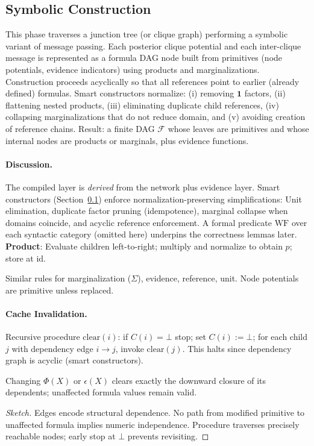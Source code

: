 \documentclass[11pt]{article}
\newcommand{\cF}{\mathcal{F}}
\newcommand{\Unit}{\mathbf{1}}
\newcommand{\Potf}{\Phi}
\newcommand{\Evid}{\epsilon}
\begin{document}
\subsection{Symbolic Construction}\label{sec:symbolic-construction}
This phase traverses a junction tree (or clique graph) performing a symbolic variant of message passing. Each posterior clique potential and each inter-clique message is represented as a formula DAG node built from primitives (node potentials, evidence indicators) using products and marginalizations. Construction proceeds acyclically so that all references point to earlier (already defined) formulas. Smart constructors normalize: (i) removing $\Unit$ factors, (ii) flattening nested products, (iii) eliminating duplicate child references, (iv) collapsing marginalizations that do not reduce domain, and (v) avoiding creation of reference chains. Result: a finite DAG $\cF$ whose leaves are primitives and whose internal nodes are products or marginals, plus evidence functions.
\paragraph{Discussion.} The compiled layer is \emph{derived} from the network plus evidence layer. Smart constructors (Section~\ref{sec:symbolic-construction}) enforce normalization-preserving simplifications: Unit elimination, duplicate factor pruning (idempotence), marginal collapse when domains coincide, and acyclic reference enforcement. A formal predicate $\mathrm{WF}$ over each syntactic category (omitted here) underpins the correctness lemmas later.
\noindent\textbf{Product}: Evaluate children left-to-right; multiply and normalize to obtain $p$; store at id.

\noindent Similar rules for marginalization ($\Sigma$), evidence, reference, unit. Node potentials are primitive unless replaced.

\paragraph{Cache Invalidation.} Recursive procedure $\mathrm{clear}(i)$: if $C(i)=\bot$ stop; set $C(i):=\bot$; for each child $j$ with dependency edge $i\to j$, invoke $\mathrm{clear}(j)$. This halts since dependency graph is acyclic (smart constructors).

\begin{lemma}[Locality]
Changing $\Potf(X)$ or $\Evid(X)$ clears exactly the downward closure of its dependents; unaffected formula values remain valid.
\end{lemma}
\begin{proof}[Sketch]
Edges encode structural dependence. No path from modified primitive to unaffected formula implies numeric independence. Procedure traverses precisely reachable nodes; early stop at $\bot$ prevents revisiting.
\end{proof}
\end{document}
